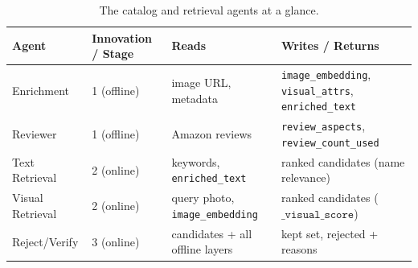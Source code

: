 \begin{table}[t]
  \centering
  \caption{The catalog and retrieval agents at a glance.}
  \label{tab:agent-summary}
  \begin{tabular}{@{}llll@{}}
    \toprule
    \textbf{Agent} & \textbf{Innovation / Stage} & \textbf{Reads} & \textbf{Writes / Returns} \\
    \midrule
    Enrichment      & 1 (offline) & image URL, metadata               & \texttt{image\_embedding}, \texttt{visual\_attrs}, \texttt{enriched\_text} \\
    Reviewer        & 1 (offline) & Amazon reviews                    & \texttt{review\_aspects}, \texttt{review\_count\_used} \\
    Text Retrieval  & 2 (online)  & keywords, \texttt{enriched\_text} & ranked candidates (name relevance) \\
    Visual Retrieval& 2 (online)  & query photo, \texttt{image\_embedding} & ranked candidates ($\texttt{\_visual\_score}$) \\
    Reject/Verify   & 3 (online)  & candidates + all offline layers   & kept set, rejected + reasons \\
    \bottomrule
  \end{tabular}
\end{table}
